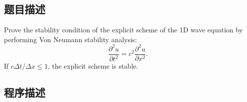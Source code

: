 \subsection{题目描述}
\noindent
Prove the stability condition of the explicit scheme of the 1D wave equation by performing Von Neumann stability analysis:
\[
    \frac{\partial^2 u}{\partial t^2} = c^2 \frac{\partial^2 u}{\partial x^2}.
\]
If \(c \Delta t / \Delta x \leq 1\), the explicit scheme is stable.

\subsection{程序描述}

